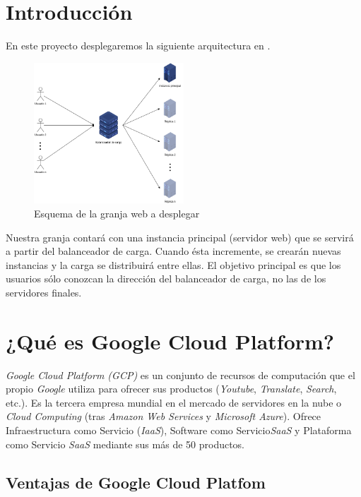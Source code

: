 \documentclass[12pt,spanish]{article}
\begin{document}
\thispagestyle{empty}
\newpage
\tableofcontents{}
\newpage


\section{Introducción}

En este proyecto desplegaremos la siguiente arquitectura en \cite{GCP}.

\begin{figure}[H]
	\centering
	\includegraphics[width=0.5\textwidth]{project/architecture.png}
	\caption{Esquema de la granja web a desplegar}
\end{figure}

Nuestra granja contará con una instancia principal (servidor web) que se servirá a partir del balanceador de carga. Cuando ésta incremente, se crearán nuevas instancias y la carga se distribuirá entre ellas. El objetivo principal es que los usuarios sólo conozcan la dirección del balanceador de carga, no las de los servidores finales.
\newpage
\section{¿Qué es Google Cloud Platform?}

\emph{Google Cloud Platform (GCP)} es un conjunto de recursos de computación que el propio \emph{Google} utiliza para ofrecer sus productos (\emph{Youtube}, \emph{Translate}, \emph{Search}, etc.). Es la tercera empresa mundial en el mercado de servidores en la nube o \emph{Cloud Computing} (tras \emph{Amazon Web Services} y \emph{Microsoft Azure}). Ofrece Infraestructura como Servicio (\emph{IaaS}), Software como Servicio\emph{SaaS} y Plataforma como Servicio \emph{SaaS} mediante sus más de 50 productos.

\subsection{Ventajas de Google Cloud Platfom}
\end{document}
